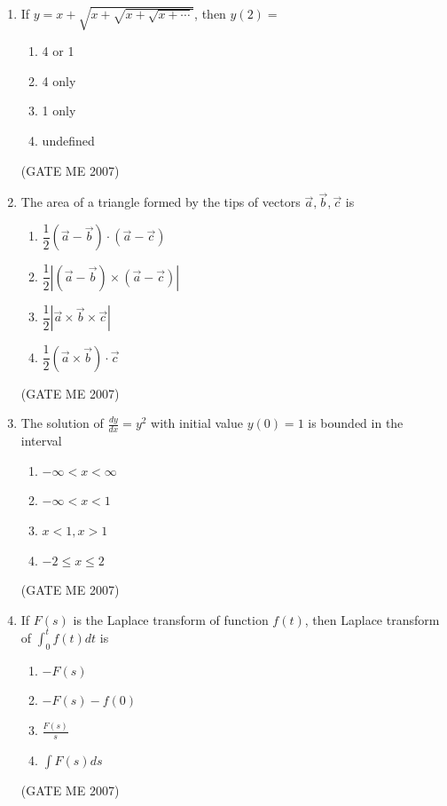 \documentclass[journal]{IEEEtran}
\begin{document}
\begin{enumerate}
\item If \( y = x + \sqrt{x + \sqrt{x + \sqrt{x + \cdots}}} \), then \( y(2) = \)
\begin{multicols}{4}
\begin{enumerate}
\item 4 or 1
\item 4 only
\item 1 only
\item undefined
\end{enumerate}
\end{multicols}
\hfill (GATE ME 2007)

\item The area of a triangle formed by the tips of vectors \( \vec{a}, \vec{b}, \vec{c} \) is
\begin{multicols}{2}
\begin{enumerate}
\item \(\dfrac{1}{2} (\vec{a} - \vec{b}) \cdot (\vec{a} - \vec{c})\)
\item \(\dfrac{1}{2} \left| (\vec{a} - \vec{b}) \times (\vec{a} - \vec{c}) \right|\)
\item \(\dfrac{1}{2} \left| \vec{a} \times \vec{b} \times \vec{c} \right|\)
\item \(\dfrac{1}{2} (\vec{a} \times \vec{b}) \cdot \vec{c}\)
\end{enumerate}
\end{multicols}
\hfill (GATE ME 2007)

\item The solution of \( \frac{dy}{dx} = y^2 \) with initial value \( y(0) = 1 \) is bounded in the interval
\begin{multicols}{4}
\begin{enumerate}
\item \( -\infty < x < \infty \)
\item \( -\infty < x < 1 \)
\item \( x < 1, x > 1 \)
\item \( -2 \leq x \leq 2 \)
\end{enumerate}
\end{multicols}
\hfill (GATE ME 2007)

\item If \( F(s) \) is the Laplace transform of function \( f(t) \), then Laplace transform of \( \int_0^t f(t) dt \) is
\begin{multicols}{4}
\begin{enumerate}
\item \( -F(s) \)
\item \( -F(s) - f(0) \)
\item \( \frac{F(s)}{s} \)
\item \( \int F(s) ds \)
\end{enumerate}
\end{multicols}
\hfill (GATE ME 2007)


\end{enumerate}
\end{document}
